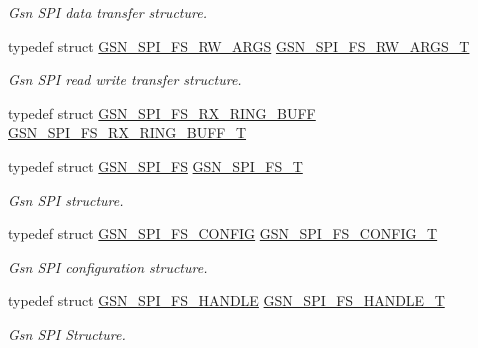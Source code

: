 \begin{DoxyCompactItemize}
\begin{DoxyCompactList}\small\item\em Gsn SPI data transfer structure. \end{DoxyCompactList}\item 
typedef struct \hyperlink{a00235}{GSN\_\-SPI\_\-FS\_\-RW\_\-ARGS} \hyperlink{a00655_gaafeeec883c4d267e64fb48904915cc43}{GSN\_\-SPI\_\-FS\_\-RW\_\-ARGS\_\-T}
\begin{DoxyCompactList}\small\item\em Gsn SPI read write transfer structure. \end{DoxyCompactList}\item 
typedef struct \hyperlink{a00236}{GSN\_\-SPI\_\-FS\_\-RX\_\-RING\_\-BUFF} \hyperlink{a00589_ad5b37aa05c264124f2cd5a565638e996}{GSN\_\-SPI\_\-FS\_\-RX\_\-RING\_\-BUFF\_\-T}
\item 
typedef struct \hyperlink{a00232}{GSN\_\-SPI\_\-FS} \hyperlink{a00655_gac18ad73594795ef9c6caa997e3b92549}{GSN\_\-SPI\_\-FS\_\-T}
\begin{DoxyCompactList}\small\item\em Gsn SPI structure. \end{DoxyCompactList}\item 
typedef struct \hyperlink{a00233}{GSN\_\-SPI\_\-FS\_\-CONFIG} \hyperlink{a00655_ga9f1e06e0752e4d0b2310b69b46111df9}{GSN\_\-SPI\_\-FS\_\-CONFIG\_\-T}
\begin{DoxyCompactList}\small\item\em Gsn SPI configuration structure. \end{DoxyCompactList}\item 
typedef struct \hyperlink{a00234}{GSN\_\-SPI\_\-FS\_\-HANDLE} \hyperlink{a00655_ga306453bdfa5ffae1498080168f2ee555}{GSN\_\-SPI\_\-FS\_\-HANDLE\_\-T}
\begin{DoxyCompactList}\small\item\em Gsn SPI Structure. \end{DoxyCompactList}\end{DoxyCompactItemize}
